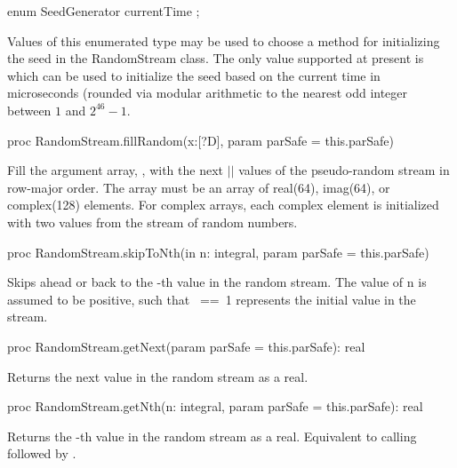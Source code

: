 \begin{protohead}
enum SeedGenerator { currentTime };
\end{protohead}
\begin{protobody}
Values of this enumerated type may be used to choose a method for
initializing the seed in the RandomStream class.  The only value
supported at present is  which can be used to
initialize the seed based on the current time in microseconds (rounded
via modular arithmetic to the nearest odd integer between $1$ and
$2^{46}-1$.
\end{protobody}

\begin{protohead}
proc RandomStream.fillRandom(x:[?D], param parSafe = this.parSafe)
\end{protohead}
\begin{protobody}
Fill the argument array, , with the next $|$$|$ values
of the pseudo-random stream in row-major order.  The array must be an
array of real(64), imag(64), or complex(128) elements.  For complex
arrays, each complex element is initialized with two values from the
stream of random numbers.
\end{protobody}

\begin{protohead}
proc RandomStream.skipToNth(in n: integral, param parSafe = this.parSafe)
\end{protohead}
\begin{protobody}
Skips ahead or back to the -th value in the
random stream.  The value of n is assumed to be positive, such that
~==~1 represents the initial value in the stream.
\end{protobody}

\begin{protohead}
proc RandomStream.getNext(param parSafe = this.parSafe): real
\end{protohead}
\begin{protobody}
Returns the next value in the random stream as a real.
\end{protobody}

\begin{protohead}
proc RandomStream.getNth(n: integral, param parSafe = this.parSafe): real
\end{protohead}
\begin{protobody}
Returns the -th value in the random stream as a real.  Equivalent to
calling  followed by .
\end{protobody}

